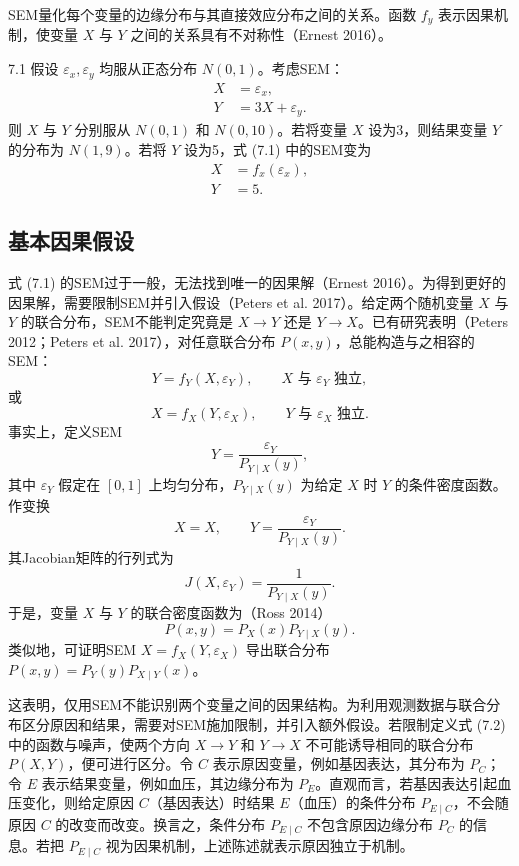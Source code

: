 SEM量化每个变量的边缘分布与其直接效应分布之间的关系。函数 $f_y$ 表示因果机制，使变量 $X$ 与 $Y$ 之间的关系具有不对称性（Ernest 2016）。

\begin{bookexample}{7.1}
假设 $\varepsilon_x,\varepsilon_y$ 均服从正态分布 $N(0,1)$。考虑SEM：
\[
\begin{aligned}X&=\varepsilon_x,\\Y&=3X+\varepsilon_y.\end{aligned}
\]
则 $X$ 与 $Y$ 分别服从 $N(0,1)$ 和 $N(0,10)$。若将变量 $X$ 设为3，则结果变量 $Y$ 的分布为 $N(1,9)$。若将 $Y$ 设为5，式 (7.1) 中的SEM变为
\[
\begin{aligned}X&=f_x(\varepsilon_x),\\Y&=5.\end{aligned}
\]
\end{bookexample}

\subsection{基本因果假设}
式 (7.1) 的SEM过于一般，无法找到唯一的因果解（Ernest 2016）。为得到更好的因果解，需要限制SEM并引入假设（Peters et al. 2017）。给定两个随机变量 $X$ 与 $Y$ 的联合分布，SEM不能判定究竟是 $X\to Y$ 还是 $Y\to X$。已有研究表明（Peters 2012；Peters et al. 2017），对任意联合分布 $P(x,y)$，总能构造与之相容的SEM：
\[
Y=f_Y(X,\varepsilon_Y),\qquad X\text{ 与 }\varepsilon_Y\text{ 独立},
\]
或
\[
X=f_X(Y,\varepsilon_X),\qquad Y\text{ 与 }\varepsilon_X\text{ 独立}.
\]
事实上，定义SEM
\begin{equation}
Y=\frac{\varepsilon_Y}{P_{Y\mid X}(y)},
\tag{7.2}
\end{equation}
其中 $\varepsilon_Y$ 假定在 $[0,1]$ 上均匀分布，$P_{Y\mid X}(y)$ 为给定 $X$ 时 $Y$ 的条件密度函数。作变换
\[
X=X,\qquad Y=\frac{\varepsilon_Y}{P_{Y\mid X}(y)}.
\]
其Jacobian矩阵的行列式为
\[
J(X,\varepsilon_Y)=\frac1{P_{Y\mid X}(y)}.
\]
于是，变量 $X$ 与 $Y$ 的联合密度函数为（Ross 2014）
\[
P(x,y)=P_X(x)P_{Y\mid X}(y).
\]
类似地，可证明SEM $X=f_X(Y,\varepsilon_X)$ 导出联合分布 $P(x,y)=P_Y(y)P_{X\mid Y}(x)$。

这表明，仅用SEM不能识别两个变量之间的因果结构。为利用观测数据与联合分布区分原因和结果，需要对SEM施加限制，并引入额外假设。若限制定义式 (7.2) 中的函数与噪声，使两个方向 $X\to Y$ 和 $Y\to X$ 不可能诱导相同的联合分布 $P(X,Y)$，便可进行区分。令 $C$ 表示原因变量，例如基因表达，其分布为 $P_C$；令 $E$ 表示结果变量，例如血压，其边缘分布为 $P_E$。直观而言，若基因表达引起血压变化，则给定原因 $C$（基因表达）时结果 $E$（血压）的条件分布 $P_{E\mid C}$，不会随原因 $C$ 的改变而改变。换言之，条件分布 $P_{E\mid C}$ 不包含原因边缘分布 $P_C$ 的信息。若把 $P_{E\mid C}$ 视为因果机制，上述陈述就表示原因独立于机制。

